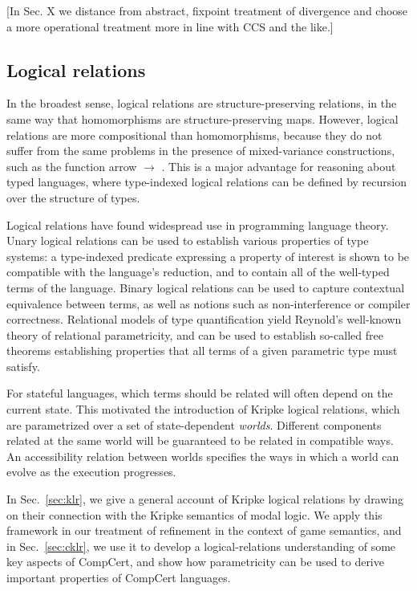 \documentclass[acmsmall,timestamp,review]{acmart}
\begin{document}
[In Sec. X we distance from abstract, fixpoint treatment
of divergence and choose a more operational treatment
more in line with CCS and the like.]


\subsection{Logical relations} %

In the broadest sense,
logical relations are structure-preserving relations,
in the same way that homomorphisms are structure-preserving maps.
However,
logical relations are more compositional than homomorphisms,
because they do not suffer from the same problems
in the presence of mixed-variance constructions,
such as the function arrow $\rightarrow$ \cite{lrp}.
This is a major advantage
for reasoning about typed languages,
where type-indexed logical relations
can be defined by recursion over the structure of types.

Logical relations have found widespread use in programming language theory.
Unary logical relations can be used to establish
various properties of type systems:
a type-indexed predicate expressing a property of interest
is shown to be compatible with the language's reduction,
and to contain all of the well-typed terms of the language.
Binary logical relations can be used to capture
contextual equivalence between terms,
as well as notions such as non-interference or compiler correctness.
Relational models of type quantification yield
Reynold's well-known theory of relational parametricity,
and can be used to establish so-called free theorems
establishing properties that
all terms of a given parametric type must satisfy.

For stateful languages,
which terms should be related
will often depend on the current state.
This motivated the introduction of Kripke logical relations,
which are parametrized over a set of state-dependent \emph{worlds}.
Different components related at the same world
will be guaranteed to be related in compatible ways.
An accessibility relation between worlds
specifies the ways in which a world can evolve
as the execution progresses.

In Sec.~\ref{sec:klr},
we give a general account of Kripke logical relations
by drawing on their connection with
the Kripke semantics of modal logic.
We apply this framework
in our treatment of refinement
in the context of game semantics,
and in Sec.~\ref{sec:cklr},
we use it to develop a logical-relations
understanding of some key aspects of CompCert,
and show how parametricity
can be used to derive important properties
of CompCert languages.
\end{document}

